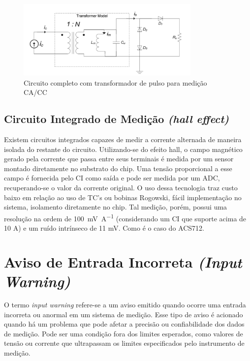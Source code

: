 \begin{figure}[htb]
    \caption{Circuito completo com transformador de pulso para medição \gls{CA}/\gls{CC}}
    \label{fig:circuito-tc-dc}
    \includegraphics[width=0.8\textwidth]{figuras/transform-corrente-dc.png}
\end{figure}

\subsection{Circuito Integrado de Medição \textit{(hall effect)}}\label{subsec:halleffect}

Existem circuitos integrados capazes de medir a corrente alternada de maneira isolada do
restante do circuito. Utilizando-se do efeito hall, o campo magnético gerado pela corrente
que passa entre seus terminais é medida por um sensor montado diretamente no substrato
do chip. Uma tensão proporcional a esse campo é fornecida pelo CI como saída e pode ser
medida por um ADC, recuperando-se o valor da corrente original.
O uso dessa tecnologia traz custo baixo em relação ao uso de TC's ou bobinas Rogowski,
fácil implementação no sistema, isolamento diretamente no chip.
Tal medição, porém, possui uma resolução na ordem de \SI{100}{\milli\volt\per\ampere} (considerando um CI que suporte acima de 10 A) e um ruído intrínseco de 11 mV. Como é o caso do ACS712.\citep{acs712}

\section{Aviso de Entrada Incorreta \textit{(Input Warning)}}\label{sec:inpWarning}

O termo \textit{input warning} refere-se a um aviso emitido quando ocorre uma entrada incorreta ou anormal em um sistema de medição. Esse tipo de aviso é acionado quando há um problema que pode afetar a precisão ou confiabilidade dos dados de medição. Pode ser uma condição fora dos limites esperados, como valores de tensão ou corrente que ultrapassam os limites especificados pelo instrumento de medição. \cite{base_alarms}

